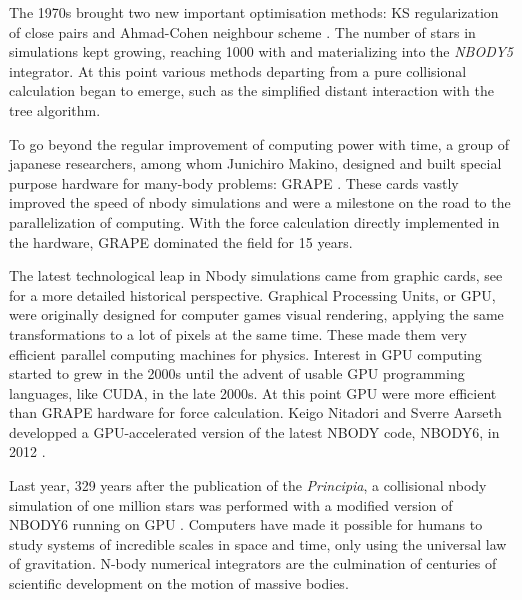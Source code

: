 The 1970s brought two new important optimisation methods: KS regularization of close pairs \citep{Aarseth1972} and Ahmad-Cohen neighbour scheme \citep{AhmadCohen1973}. The number of stars in simulations kept growing, reaching 1000 with \cite{Terlevich1980} and materializing into the \textit{NBODY5} integrator. At this point various methods departing from a pure collisional calculation began to emerge, such as the simplified distant interaction with the \cite{BarnesHut1986} tree algorithm.

To go beyond the regular improvement of computing power with time, a group of japanese researchers, among whom Junichiro Makino, designed and built special purpose hardware for many-body problems: GRAPE \citep{Ebisuzaki1990,Ito1991}. These cards vastly improved the speed of nbody simulations and were a milestone on the road to the parallelization of computing. With the force calculation directly implemented in the hardware, GRAPE dominated the field for 15 years.

The latest technological leap in Nbody simulations came from graphic cards, see \cite{Bedorf2012} for a more detailed historical perspective. Graphical Processing Units, or GPU, were originally designed for computer games visual rendering, applying the same transformations to a lot of pixels at the same time. These made them very efficient parallel computing machines for physics. Interest in GPU computing started to grew in the 2000s \citep{Nyland2004,Elsen2006,SPZ2007} until the advent of usable GPU programming languages, like CUDA, in the late 2000s. At this point GPU were more efficient than GRAPE hardware for force calculation. Keigo Nitadori and Sverre Aarseth developped a GPU-accelerated version of the latest NBODY code, NBODY6, in 2012 \citep{Nitadori2012}.

Last year, 329 years after the publication of the \textit{Principia}, a collisional nbody simulation of one million stars was performed with a modified version of NBODY6 running on GPU \citep{Wang2015}. Computers have made it possible for humans to study systems of incredible scales in space and time, only using the universal law of gravitation. N-body numerical integrators are the culmination of centuries of scientific development on the motion of massive bodies.